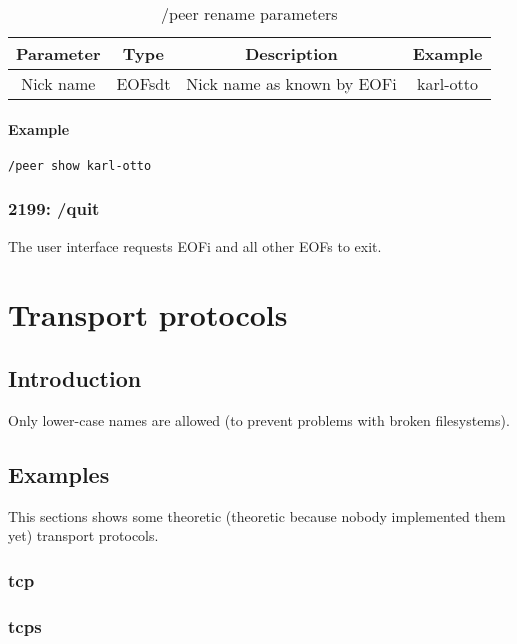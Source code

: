 \documentclass[12pt,a4paper]{book}
\begin{document}
%
\begin{longtable}{|c|c|c|c|}
\caption{/peer rename parameters}\\
\hline
\textbf{Parameter} & \textbf{Type} & \textbf{Description} & \textbf{Example}\\
\hline
Nick name & EOFsdt & Nick name as known by EOFi & karl-otto\\
\hline
\end{longtable}

\subsubsection{Example}
\begin{verbatim}
/peer show karl-otto
\end{verbatim}
\subsection{2199: /quit}
The user interface requests EOFi and all other EOFs to exit.
\chapter{Transport protocols}
\section{Introduction}
Only lower-case names are allowed (to prevent problems with broken filesystems).
\section{Examples}
This sections shows some theoretic (theoretic because nobody implemented
them yet) transport protocols.
\subsection{tcp}
\subsection{tcps}
\end{document}
